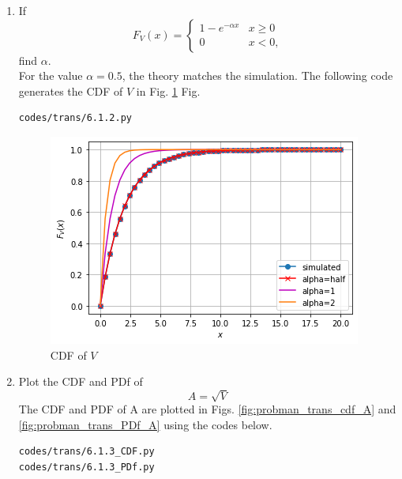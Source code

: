 \begin{enumerate}[label=\thesubsection.\arabic*.,ref=\thesubsection.\theenumi]
\item
If
%
\begin{equation}
F_{V}(x) = 
\begin{cases}
1 - e^{-\alpha x} & x \geq 0 \\
0 & x < 0,
\end{cases}
\label{eq:probman_F_V_alpha}
\end{equation}
%
find $\alpha$.
\\
\solution For the value $\alpha=0.5$, the theory matches the simulation.  
The following code generates the CDF of $V$ in Fig. \ref{fig:probman_F_V_alpha} 
Fig. 
\begin{lstlisting}
codes/trans/6.1.2.py
\end{lstlisting}
%
\begin{figure}[!ht]
\centering
\includegraphics[width=\columnwidth]{./figs/trans/6.1.2.png}
\caption{CDF of $V$}
\label{fig:probman_F_V_alpha}
\end{figure}
%
%
\item
\label{ch3_raleigh_sim}
Plot the CDF and PDf of
%
\begin{equation}
A = \sqrt{V}
\end{equation}
%
\solution The CDF and PDF of A are plotted in Figs. \ref{fig:probman_trans_cdf_A} and \ref{fig:probman_trans_PDf_A}
using the codes below.
\begin{lstlisting}
codes/trans/6.1.3_CDF.py
codes/trans/6.1.3_PDf.py
\end{lstlisting}


\end{enumerate}
